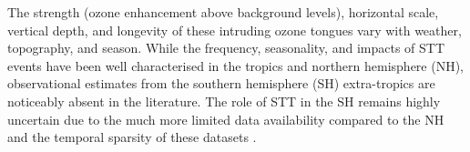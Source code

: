 The strength (ozone enhancement above background levels), horizontal scale, vertical depth, and longevity of these intruding ozone tongues vary with weather, topography, and season.
While the frequency, seasonality, and impacts of STT events have been well characterised in the tropics and northern hemisphere (NH), observational estimates from the southern hemisphere (SH) extra-tropics are noticeably absent in the literature. 
The role of STT in the SH remains highly uncertain due to the much more limited data availability compared to the NH and the temporal sparsity of these datasets \citep{Mze2010, Thompson2014, Liu2015}. 



